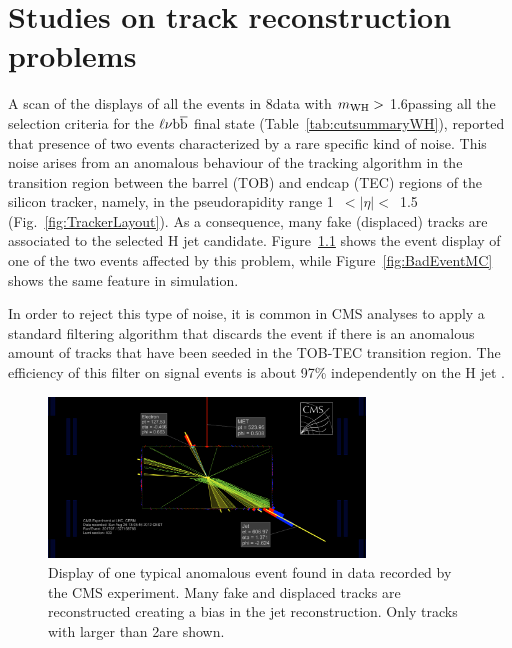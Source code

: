 \chapter{Studies on track reconstruction problems}\label{app:tobtec}

A scan of the displays of all the events in 8\TeV data with $m_{\rm WH} >$ 1.6\TeV passing all the selection criteria for the $\ell\nu{\mathrm{b}\overline{\mathrm{b}}}$ final state (Table~\ref{tab:cutsummaryWH}),
reported that presence of two events characterized by a rare specific kind of noise.
This noise arises from an anomalous behaviour of the tracking algorithm in the transition region between the barrel (TOB) and endcap (TEC) regions of the silicon tracker,
namely, in the pseudorapidity range 1~$<|\eta|<$~1.5 (Fig.~\ref{fig:TrackerLayout}). As a consequence, many fake (displaced) tracks are associated to the selected H jet candidate.
Figure~\ref{fig:BadEventData} shows the event display of one of the two events
affected by this problem, while Figure~\ref{fig:BadEventMC} shows the same feature in simulation.

In order to reject this type of noise, it is common in CMS analyses to apply a standard filtering algorithm that discards the event if 
there is an anomalous amount of tracks that have been seeded in the TOB-TEC transition region.
The efficiency of this filter on signal events is about 97\% independently on the H jet \pt.

\begin{figure}[!htb]
\centering
\includegraphics[width=0.75\textwidth]{Appendix/Figures/SingleEleC_Run201707_Event527168766_Lumi403_badEvent.png}
\caption{Display of one typical anomalous event found in data recorded by the CMS experiment. 
Many fake and displaced tracks are reconstructed creating a bias in the jet reconstruction.
Only tracks with \pt larger than 2\GeV are shown.}
\label{fig:BadEventData}
\end{figure}

